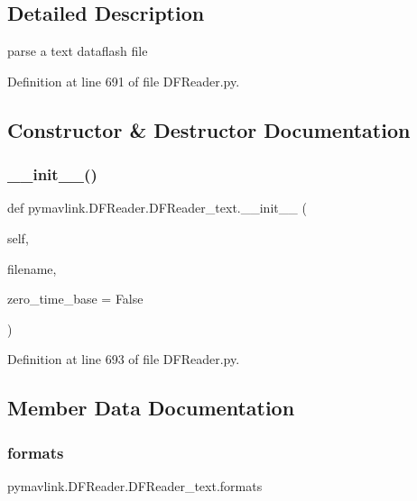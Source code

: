 \subsection{Detailed Description}
\begin{DoxyVerb}parse a text dataflash file\end{DoxyVerb}
 

Definition at line 691 of file D\+F\+Reader.\+py.



\subsection{Constructor \& Destructor Documentation}
\mbox{\label{classpymavlink_1_1DFReader_1_1DFReader__text_a76e07d046a48e72103c6823ce889c82c}} 
\subsubsection{\texorpdfstring{\_\_init\_\_()}{\_\_init\_\_()}}
{\footnotesize\ttfamily def pymavlink.\+D\+F\+Reader.\+D\+F\+Reader\+\_\+text.\+\_\+\+\_\+init\+\_\+\+\_\+ (\begin{DoxyParamCaption}\item[{}]{self,  }\item[{}]{filename,  }\item[{}]{zero\+\_\+time\+\_\+base = {\ttfamily False} }\end{DoxyParamCaption})}



Definition at line 693 of file D\+F\+Reader.\+py.



\subsection{Member Data Documentation}
\mbox{\label{classpymavlink_1_1DFReader_1_1DFReader__text_ab35c6d78779a3b0f8bd472db02012b15}} 
\subsubsection{\texorpdfstring{formats}{formats}}
{\footnotesize\ttfamily pymavlink.\+D\+F\+Reader.\+D\+F\+Reader\+\_\+text.\+formats}




